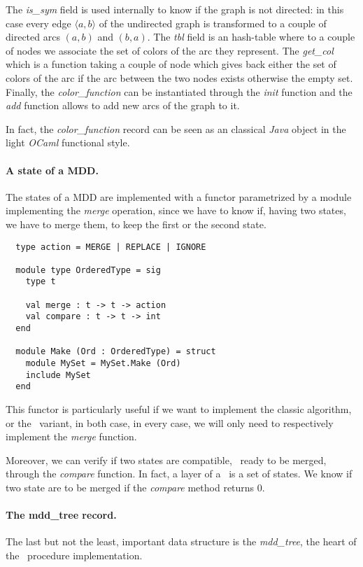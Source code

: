 The \textit{is\_sym} field is used internally to know if the graph is not directed: in this case every edge $\langle a, b \rangle$ of the undirected graph is transformed to a couple of directed arcs $(a,b)$ and $(b,a)$. The \textit{tbl} field is an hash-table where to a couple of nodes we associate the set of colors of the arc they represent. The \textit{get\_col} which is a function taking a couple of node which gives back either the set of colors of the arc if the arc between the two nodes exists otherwise the empty set. Finally, the \textit{color\_function} can be instantiated through the \textit{init} function and the \textit{add} function allows to add new arcs of the graph to it.

In fact, the \textit{color\_function} record can be seen as an classical \textit{Java} object in the light \textit{OCaml} functional style.

\paragraph{A state of a MDD.} The states of a MDD are implemented with a functor\cite{ocamlfunctor} parametrized by a module implementing the \textit{merge} operation, since we have to know if, having two states, we have to merge them, to keep the first or the second state.

\begin{verbatim}
  type action = MERGE | REPLACE | IGNORE

  module type OrderedType = sig
    type t
  
    val merge : t -> t -> action
    val compare : t -> t -> int
  end
  
  module Make (Ord : OrderedType) = struct
    module MySet = MySet.Make (Ord)
    include MySet
  end
\end{verbatim}

This functor is particularly useful if we want to implement the classic algorithm, or the \alldiff\ variant, in both case, in every case, we will only need to respectively implement the \textit{merge} function.

Moreover, we can verify if two states are compatible, \ie\ ready to be merged, through the \textit{compare} function. In fact, a layer of a \mdd\ is a set of states. We know if two state are to be merged if the \textit{compare} method returns $0$.

\paragraph{The mdd\_tree record.} The last but not the least, important data structure is the \textit{mdd\_tree}, the heart of the \mdd\ procedure implementation.

